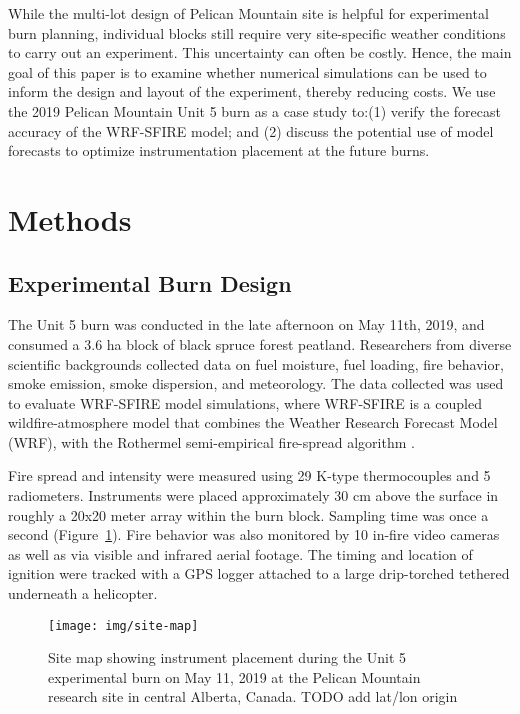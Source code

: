 \documentclass[preprints,article,accept,moreauthors,pdftex]{Definitions/mdpi}
\begin{document}
While the multi-lot design of Pelican Mountain site is helpful for experimental burn planning, individual blocks still require very site-specific weather conditions to carry out an experiment. This uncertainty can often be costly. Hence, the main goal of this paper is to examine whether numerical simulations can be used to inform the design and layout of the experiment, thereby reducing costs. We use the 2019 Pelican Mountain Unit 5 burn as a case study to:(1) verify the forecast accuracy of the WRF-SFIRE model; and (2) discuss the potential use of model forecasts to optimize instrumentation placement at the future burns.

\section{Methods}
\subsection{Experimental Burn Design}

The Unit 5 burn was conducted in the late afternoon on May 11th, 2019, and consumed a 3.6 ha block of black spruce forest peatland. Researchers from diverse scientific backgrounds collected data on fuel moisture, fuel loading, fire behavior, smoke emission, smoke dispersion, and meteorology. The data collected was used to evaluate WRF-SFIRE model simulations, where WRF-SFIRE is a coupled wildfire-atmosphere model that combines the Weather Research Forecast Model (WRF), with the Rothermel semi-empirical fire-spread algorithm \cite{mandel_coupled_2011,mandel_recent_2014}.

Fire spread and intensity were measured using 29 K-type thermocouples and 5 radiometers. Instruments were placed approximately 30 cm above the surface in roughly a 20x20 meter array within the burn block. Sampling time was once a second (Figure~\ref{fig1}). Fire behavior was also monitored by 10 in-fire video cameras as well as via visible and infrared aerial footage. The timing and location of ignition were tracked with a GPS logger attached to a large drip-torched tethered underneath a helicopter.


\begin{figure}[H]
\centering
 \texttt{[image: img/site-map]}
 \caption{Site map showing instrument placement during the Unit 5 experimental burn on May 11, 2019 at the Pelican Mountain research site in central Alberta, Canada. TODO add lat/lon origin \label{fig1}}
 \end{figure}
\end{document}
